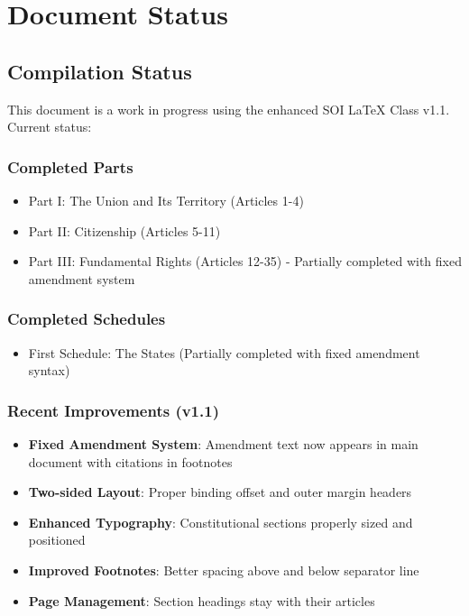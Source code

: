 \documentclass[a4paper,12pt,showamendments,twoside]{soi}
\begin{document}
\ifcompilepart
    \cleardoublepage
    \section*{Document Status}
    
    \subsection*{Compilation Status}
    This document is a work in progress using the enhanced SOI LaTeX Class v1.1. Current status:
    
    \subsubsection*{Completed Parts}
    \begin{itemize}
    \item Part I: The Union and Its Territory (Articles 1-4)
    \item Part II: Citizenship (Articles 5-11)  
    \item Part III: Fundamental Rights (Articles 12-35) - Partially completed with fixed amendment system
    \end{itemize}
    
    \subsubsection*{Completed Schedules}
    \begin{itemize}
    \item First Schedule: The States (Partially completed with fixed amendment syntax)
    \end{itemize}
    
    \subsubsection*{Recent Improvements (v1.1)}
    \begin{itemize}
    \item \textbf{Fixed Amendment System}: Amendment text now appears in main document with citations in footnotes
    \item \textbf{Two-sided Layout}: Proper binding offset and outer margin headers
    \item \textbf{Enhanced Typography}: Constitutional sections properly sized and positioned
    \item \textbf{Improved Footnotes}: Better spacing above and below separator line
    \item \textbf{Page Management}: Section headings stay with their articles
    \end{itemize}
    
\end{document}
